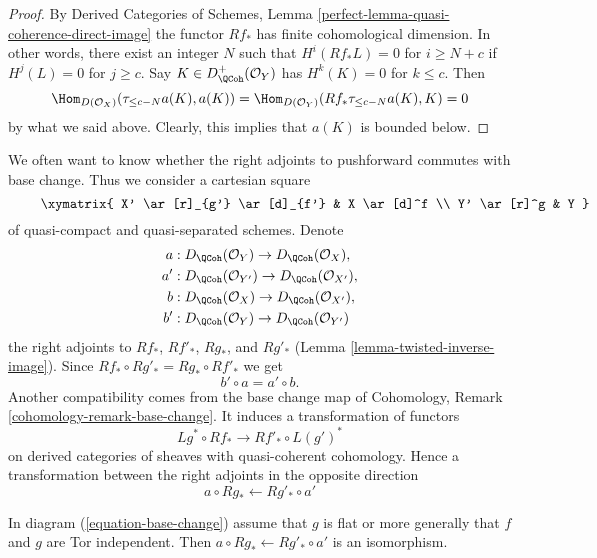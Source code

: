 \begin{proof}
By Derived Categories of Schemes, Lemma
\ref{perfect-lemma-quasi-coherence-direct-image}
the functor $Rf_*$ has finite cohomological dimension. In other words,
there exist an integer $N$ such that
$H^i(Rf_*L) = 0$ for $i \geq N + c$ if $H^j(L) = 0$ for $j \geq c$.
Say $K \in D^+_\QCoh(\mathcal{O}_Y)$ has $H^k(K) = 0$ for $k \leq c$.
Then
$$
\Hom_{D(\mathcal{O}_X)}(\tau_{\leq c - N}a(K), a(K)) =
\Hom_{D(\mathcal{O}_Y)}(Rf_*\tau_{\leq c - N}a(K), K) = 0
$$
by what we said above. Clearly, this implies that $a(K)$ is bounded below.
\end{proof}

\noindent
We often want to know whether the right adjoints to pushforward commutes
with base change. Thus we consider a cartesian square
\begin{equation}
\label{equation-base-change}
\vcenter{
\xymatrix{
X' \ar[r]_{g'} \ar[d]_{f'} & X \ar[d]^f \\
Y' \ar[r]^g & Y
}
}
\end{equation}
of quasi-compact and quasi-separated schemes.
Denote
\begin{align*}
a  & : D_\QCoh(\mathcal{O}_Y) \to D_\QCoh(\mathcal{O}_X), \\
a' & : D_\QCoh(\mathcal{O}_{Y'}) \to D_\QCoh(\mathcal{O}_{X'}), \\
b  & : D_\QCoh(\mathcal{O}_X) \to D_\QCoh(\mathcal{O}_{X'}), \\
b' & : D_\QCoh(\mathcal{O}_Y) \to D_\QCoh(\mathcal{O}_{Y'})
\end{align*}
the right adjoints to $Rf_*$, $Rf'_*$, $Rg_*$, and $Rg'_*$
(Lemma \ref{lemma-twisted-inverse-image}). Since
$Rf_* \circ Rg'_* = Rg_* \circ Rf'_*$ we get
$$
b' \circ a = a' \circ b.
$$
Another compatibility comes from the base change map of
Cohomology, Remark \ref{cohomology-remark-base-change}.
It induces a transformation of functors
$$
Lg^* \circ Rf_* \longrightarrow Rf'_* \circ L(g')^*
$$
on derived categories of sheaves with quasi-coherent cohomology.
Hence a transformation between the right adjoints in the opposite direction
$$
a \circ Rg_* \longleftarrow Rg'_* \circ a'
$$

\begin{lemma}
\label{lemma-flat-precompose-pus}
In diagram (\ref{equation-base-change}) assume that $g$ is flat or
more generally that $f$ and $g$ are Tor independent. Then
$a \circ Rg_* \leftarrow Rg'_* \circ a'$ is an isomorphism.
\end{lemma}

